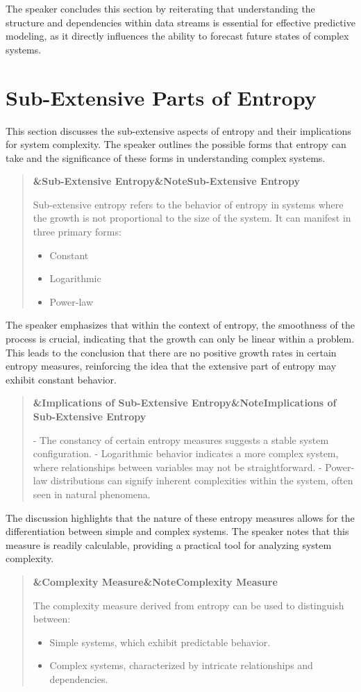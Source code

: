 \documentclass[a4paper]{article}
\newcommand{\boxheading}[1]{%
  \par\smallskip
  \noindent\textbf{\ifx&#1&Note\else#1\fi}\par
  \smallskip
}
\newenvironment{thmbox}[1][]{%
  \begin{quote}\color{blue!60!black}\boxheading{#1}\normalcolor
}{\end{quote}}
\newenvironment{defbox}[1][]{%
  \begin{quote}\color{green!40!black}\boxheading{#1}\normalcolor
}{\end{quote}}
\newenvironment{rembox}[1][]{%
  \begin{quote}\color{black!70}\boxheading{#1}\normalcolor
}{\end{quote}}
\begin{document}
The speaker concludes this section by reiterating that understanding the structure and dependencies within data streams is essential for effective predictive modeling, as it directly influences the ability to forecast future states of complex systems.

\section{Sub-Extensive Parts of Entropy}
This section discusses the sub-extensive aspects of entropy and their implications for system complexity. The speaker outlines the possible forms that entropy can take and the significance of these forms in understanding complex systems.

\begin{defbox}[Sub-Extensive Entropy]
Sub-extensive entropy refers to the behavior of entropy in systems where the growth is not proportional to the size of the system. It can manifest in three primary forms:
\begin{itemize}
    \item Constant
    \item Logarithmic
    \item Power-law
\end{itemize}
\end{defbox}

The speaker emphasizes that within the context of entropy, the smoothness of the process is crucial, indicating that the growth can only be linear within a problem. This leads to the conclusion that there are no positive growth rates in certain entropy measures, reinforcing the idea that the extensive part of entropy may exhibit constant behavior.

\begin{rembox}[Implications of Sub-Extensive Entropy]
- The constancy of certain entropy measures suggests a stable system configuration.
- Logarithmic behavior indicates a more complex system, where relationships between variables may not be straightforward.
- Power-law distributions can signify inherent complexities within the system, often seen in natural phenomena.
\end{rembox}

The discussion highlights that the nature of these entropy measures allows for the differentiation between simple and complex systems. The speaker notes that this measure is readily calculable, providing a practical tool for analyzing system complexity.

\begin{thmbox}[Complexity Measure]
The complexity measure derived from entropy can be used to distinguish between:
\begin{itemize}
    \item Simple systems, which exhibit predictable behavior.
    \item Complex systems, characterized by intricate relationships and dependencies.
\end{itemize}
\end{thmbox}
\end{document}
